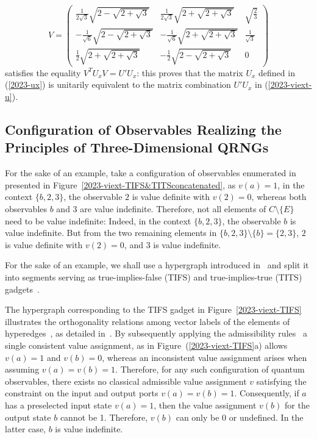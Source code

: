 \documentclass[%
 superscriptaddress,
  preprint,
 showpacs,
 showkeys,
 nofootinbib,
  amsmath,amssymb,
 pra,
  longbibliography,
  floatfix,
 ]{revtex4-2}
\theoremstyle{definition}
\begin{document}
\begin{equation}
V=
\begin{pmatrix}
 \frac{1}{2\sqrt{3}} \sqrt{2-\sqrt{2+\sqrt{3}}}
   & \frac{1}{2\sqrt{3}} \sqrt{2+\sqrt{2+\sqrt{3}}} & \sqrt{\frac{2}{3}} \\
 -\frac{1}{\sqrt{6}}\sqrt{2-\sqrt{2+\sqrt{3}}} &
   -\frac{1}{\sqrt{6}} \sqrt{2+\sqrt{2+\sqrt{3}}} &
   \frac{1}{\sqrt{3}} \\
 \frac{1}{2} \sqrt{2+\sqrt{2+\sqrt{3}}} & -\frac{1}{2}
   \sqrt{2-\sqrt{2+\sqrt{3}}} & 0
\end{pmatrix}
\end{equation}
satisfies the equality  $V^TU_xV=U'U_x$: this proves
 that the matrix $U_x$ defined in (\ref{2023-ux}) is unitarily equivalent to the matrix combination $U'U_x$ in (\ref{2023-viext-u}).



\subsection{Configuration of Observables Realizing the Principles of Three-Dimensional QRNGs}


For the sake of an example, take a configuration of observables enumerated  in~\cite[Table~I]{2018-minimalYIYS}
presented in Figure~\ref{2023-viext-TIFS&TITSconcatenated},  as $v(a)=1$,
in the context $\{b,2,3\}$, the observable $2$ is value definite with $v(2)=0$, whereas
both observables
$b$ and $3$ are value indefinite.
Therefore, not all elements of $C\setminus \{E\}$ need to be value indefinite:
Indeed, in the context $\{b,2,3\}$, the observable $b$ is value indefinite.
But from the two remaining elements in $\{b,2,3\} \setminus \{b\}=\{2,3\}$,
$2$ is value definite with $v(2)=0$,
and $3$ is value indefinite.

\medskip

For the sake of an example, we shall use a hypergraph introduced in~\cite{2015-AnalyticKS}
and split it into segments serving as true-implies-false (TIFS) and true-implies-true (TITS) gadgets~\cite{2018-minimalYIYS}.


The hypergraph corresponding to the TIFS gadget  in Figure~\ref{2023-viext-TIFS}
illustrates the orthogonality relations among vector labels of the elements of hyperedges~\cite{lovasz-79}, as detailed in~\cite[Table~I]{2018-minimalYIYS}.
By subsequently applying the admissibility rules~\cite[Figure~(24.2.a)]{Svozil-2018-p} a single consistent value assignment,
as in Figure~(\ref{2023-viext-TIFS}a) allows $v(a)=1$ and $v(b)=0$, whereas
an inconsistent value assignment arises when assuming $v(a)=v(b)=1$.
Therefore, for any such configuration of quantum observables, there exists no classical admissible value assignment $v$
satisfying the constraint on the input and output ports $v(a)=v(b)=1$.
Consequently, if $a$ has a preselected input state $v(a)=1$, then
the value assignment $v(b)$ for the output state $b$ cannot be 1.
Therefore, $v(b)$ can only be 0 or undefined.
In the latter case, $b$
is value indefinite.
\end{document}
